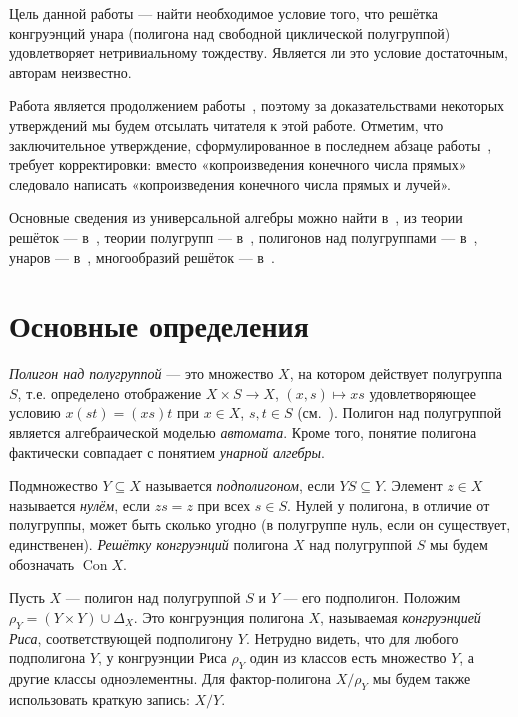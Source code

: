 \documentclass[11pt,twoside,final
]{article}
\def\Con{\operatorname{Con}}
\begin{document}
Цель данной работы — найти необходимое условие того, что решётка конгруэнций унара (полигона над свободной циклической полугруппой) удовлетворяет нетривиальному тождеству.
Является ли это условие достаточным, авторам неизвестно.

Работа является продолжением работы~\cite{Kozhukhov_8}, поэтому за доказательствами некоторых утверждений мы будем отсылать читателя к этой работе.
Отметим, что заключительное утверждение, сформулированное в последнем абзаце работы~\cite{Kozhukhov_8}, требует корректировки: вместо «копроизведения конечного числа прямых» следовало написать «копроизведения конечного числа прямых и лучей».

Основные сведения из универсальной алгебры можно найти в~\cite{Kohn_9}, из теории решёток — в~\cite{Gretzer_10}, теории полугрупп — в~\cite{Clifford_11}, полигонов над полугруппами — в~\cite{Kilp_1}, унаров — в~\cite{Jakubikova_12}, многообразий решёток — в~\cite{Jipsen_13}.

\section{Основные определения}

\textit{Полигон над полугруппой} — это множество $X$, на котором действует полугруппа $S$, т.е. определено отображение $X \times S \to X$, $(x,s) \mapsto xs$ удовлетворяющее условию $x(st) = (xs)t$ при $x \in X$, $s,t \in S$ (см.~\cite{Kilp_1}).
Полигон над полугруппой является алгебраической моделью \textit{автомата}.
Кроме того, понятие полигона фактически совпадает с понятием \textit{унарной алгебры}.

Подмножество $Y \subseteq X$ называется \textit{подполигоном}, если $YS \subseteq Y$.
Элемент $z \in X$ называется \textit{нулём}, если $zs = z$ при всех $s \in S$.
Нулей у полигона, в отличие от полугруппы, может быть сколько угодно (в полугруппе нуль, если он существует, единственен).
\textit{Решётку конгруэнций} полигона $X$ над полугруппой $S$ мы будем обозначать $\Con X$.

Пусть $X$ — полигон над полугруппой $S$ и $Y$ — его подполигон.
Положим $ \rho_Y = (Y \times Y) \cup \Delta_X $.
Это конгруэнция полигона $X$, называемая \textit{конгруэнцией Риса}, соответствующей подполигону $Y$.
Нетрудно видеть, что для любого подполигона $Y$, у конгруэнции Риса $\rho_Y$ один из классов есть множество $Y$, а другие классы одноэлементны.
Для фактор-полигона $X/\rho_Y$ мы будем также использовать краткую запись: $X/Y$.
\end{document}
